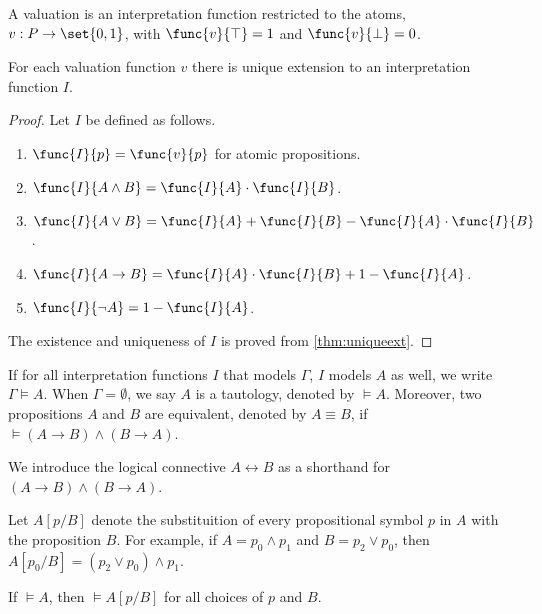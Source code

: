 \begin{definition}
    A valuation is an interpretation function restricted to the atoms, \(v : P \to \set{0,1}\), with \(\func{v}{\top} = 1\) and \(\func{v}{\bot} = 0\).
\end{definition}


\begin{theorem}
    For each valuation function \(v\) there is unique extension to an interpretation function \(I\).
\end{theorem}

\begin{proof}
    Let \(I\) be defined as follows.
    \begin{enumerate}
        \item \(\func{I}{p} = \func{v}{p}\) for atomic propositions.
        \item \(\func{I}{A \land B} = \func{I}{A} \cdot \func{I}{B}\).
        \item \(\func{I}{A \lor B} = \func{I}{A} + \func{I}{B} - \func{I}{A}\cdot \func{I}{B}\).
        \item \(\func{I}{A \to B} = \func{I}{A}\cdot \func{I}{B} + 1 - \func{I}{A}\).
        \item \(\func{I}{\neg A} = 1- \func{I}{A}\).
    \end{enumerate}
    The existence and uniqueness of \(I\) is proved from \autoref{thm:uniqueext}.
\end{proof}

\begin{definition}
    If for all interpretation functions \(I\) that models \(\Gamma\), \(I\) models \(A\) as well, we write \(\Gamma \models A\). When \(\Gamma = \emptyset\), we say \(A\) is a tautology, denoted by \(\models A\). Moreover, two propositions \(A\) and \(B\) are equivalent, denoted by \(A \equiv B\), if \(\models (A \to B) \land (B \to A)\).
\end{definition}
We introduce the logical connective \(A \leftrightarrow B\) as a shorthand for \((A \to B) \land (B \to A)\).

Let \(A[p/B]\) denote the substituition of every propositional symbol \(p\) in \(A\) with the proposition \(B\). For example, if \(A = p_0 \land p_1\) and \(B = p_2 \lor p_0\), then \(A[p_0/B] = (p_2 \lor p_0) \land p_1\).

\begin{theorem}
    If \(\models A\), then \(\models A[p/B]\) for all choices of \(p\) and \(B\).
\end{theorem}

